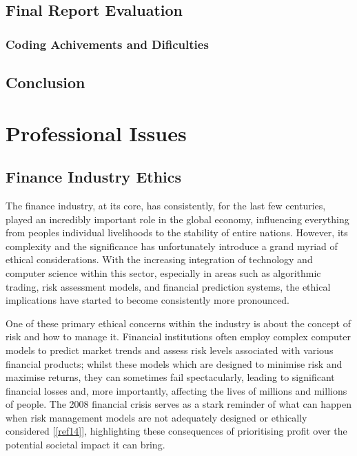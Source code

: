 \documentclass{article}
\begin{document}
\subsection{Final Report Evaluation}

\subsubsection{Coding Achivements and Dificulties}

\subsection{Conclusion}


\section{Professional Issues}

\subsection{Finance Industry Ethics}

The finance industry, at its core, has consistently, for the last few centuries, played an incredibly important role in the global economy, influencing everything from peoples individual livelihoods to the stability of entire nations. However, its complexity and the significance has unfortunately introduce a grand myriad of ethical considerations. With the increasing integration of technology and computer science within this sector, especially in areas such as algorithmic trading, risk assessment models, and financial prediction systems, the ethical implications have started to become consistently more pronounced.\\\vspace{0.3cm}

One of these primary ethical concerns within the industry is about the concept of risk and how to manage it. Financial institutions often employ complex computer models to predict market trends and assess risk levels associated with various financial products; whilst these models which are designed to minimise risk and maximise returns, they can sometimes fail spectacularly, leading to significant financial losses and, more importantly, affecting the lives of millions and millions of people. The 2008 financial crisis serves as a stark reminder of what can happen when risk management models are not adequately designed or ethically considered [\ref{ref14}], highlighting these consequences of prioritising profit over the potential societal impact it can bring.\\\vspace{0.3cm}
\end{document}
